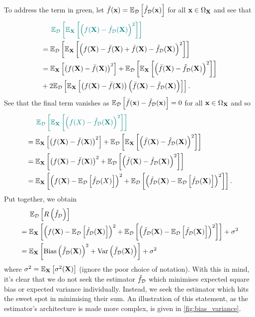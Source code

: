 \documentclass[11pt]{article}
\begin{document}
To address the term in green, let $\bar{f}(\mathbf{x})=\mathbb{E}_{\mathcal{D}}\left[\hat{f}_{\mathcal{D}}(\mathbf{x})\right]$ for all $\mathbf{x}\in\Omega_{\mathbf{X}}$ and see that
\begin{align*}
    &\hspace{14.52pt}
    \textcolor{myGreen}{\E_{\D}\l[\E_\X\l[\l(f(\X)-\hat{f}_{\D}(\X)\r)^2\r]\r]}\\
    &=
    \E_{\D}\l[\E_\X\l[\l(f(\X)-\bar{f}(\X)+\bar{f}(\X)-\hat{f}_{\D}(\X)\r)^2\r]\r]\\
    &=
    \E_\X\l[\l(f(\X)-\bar{f}(\X)\r)^2\r]+\E_{\D}\l[\E_\X\l[\l(\bar{f}(\X)-\hat{f}_{\D}(\X)\r)^2\r]\r]\\
    &+
    2\E_{\D}\l[\E_\X\l[\l(f(\X)-\bar{f}(\X)\r)\l(\bar{f}(\X)-\hat{f}_{\D}(\X)\r)\r]\r].
\end{align*}
See that the final term vanishes as $\mathbb{E}_{\mathcal{D}}\left[\bar{f}(\mathbf{x})-\hat{f}_{\mathcal{D}}(\mathbf{x})\right]=0$ for all $\mathbf{x}\in\Omega_{\mathbf{X}}$ and so
\begin{align*}
    &\hspace{14.52pt}
    \textcolor{myGreen}{\E_{\D}\l[\E_\X\l[\l(f(X)-\hat{f}_{\D}(\X)\r)^2\r]\r]}\\
    &=
    \E_\X\l[\l(f(\X)-\bar{f}(\X)\r)^2\r]+\E_{\D}\l[\E_\X\l[\l(\bar{f}(\X)-\hat{f}_{\D}(\X)\r)^2\r]\r]\\
    &=
    \E_\X\l[\l(f(\X)-\bar{f}(\X)\r)^2+\E_{\D}\l[\l(\bar{f}(\X)-\hat{f}_{\D}(\X)\r)^2\r]\r]\\
    &=
    \E_\X\l[\l(f(\X)-\E_{\D}\l[\hat{f}_{\D}(X)\r]\r)^2+\E_{\D}\l[\l(\hat{f}_{\D}(\X)-\E_{\D}\l[\hat{f}_{\D}(\X)\r]\r)^2\r]\r].
\end{align*}
Put together, we obtain
\begin{align*}
    &\hspace{14.52pt}
    \mathbb{E}_{\mathcal{D}}\left[R\left(\hat{f}_{\mathcal{D}}\right)\right]\\
    &=
    \mathbb{E}_{\mathbf{X}}\left[\left(f(\mathbf{X})-\mathbb{E}_{\mathcal{D}}\left[\hat{f}_{\mathcal{D}}(\mathbf{X})\right]\right)^2+\mathbb{E}_{\mathcal{D}}\left[\left(\hat{f}_{\mathcal{D}}(\mathbf{X})-\mathbb{E}_{\mathcal{D}}\left[\hat{f}_{\mathcal{D}}(\mathbf{X})\right]\right)^2\right]\right]+\sigma^2\\
    &=
    \mathbb{E}_{\mathbf{X}}\left[\text{Bias}\left(\hat{f}_{\mathcal{D}}(\mathbf{X})\right)^2+\text{Var}\left(\hat{f}_{\mathcal{D}}(\mathbf{X})\right)\right]+\sigma^2
\end{align*}
where $\sigma^2=\mathbb{E}_{\mathbf{X}}\left[\sigma^2(\mathbf{X})\right]$ (ignore the poor choice of notation). With this in mind, it's clear that we do not seek the estimator $\hat{f}_{\mathcal{D}}$ which minimises expected square bias or expected variance individually. Instead, we seek the estimator which hits the sweet spot in minimising their sum. An illustration of this statement, as the estimator's architecture is made more complex, is given in \autoref{fig:bias_variance}.
\end{document}
